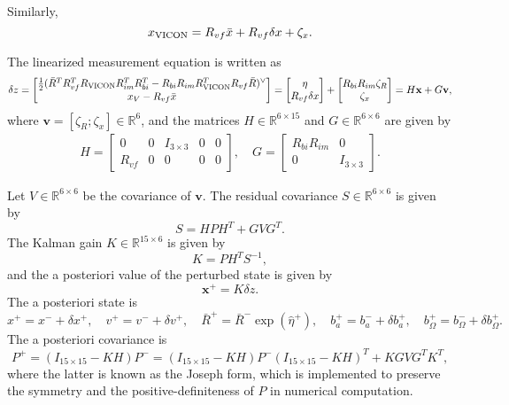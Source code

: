 \documentclass[11pt]{article}
\renewcommand{\Re}{\ensuremath{\mathbb{R}}}
\newcommand{\x}{\mathbf{x}}
\begin{document}
Similarly,
\[
x_{\mathrm{VICON}} = R_{vf}\bar x + R_{vf}\delta x + \zeta_x.
\]

The linearized measurement equation is written as
\begin{align*}
\delta z=\begin{bmatrix} \frac{1}{2}(\bar R^T R_{vf}^T R_\V R_{im}^T R_{bi}^T  -R_{bi}R_{im} R_\V^T R_{vf}\bar R)^\vee\\
x_V-R_{vf}\bar x\end{bmatrix}
= 
\begin{bmatrix}
\eta \\
R_{vf} \delta x 
\end{bmatrix}
+
\begin{bmatrix}
R_{bi}R_{im}\zeta_R \\
\zeta_x
\end{bmatrix}
=
H\x + G\mathbf{v},
\end{align*}
where $\mathbf{v}=[\zeta_R; \zeta_x]\in\Re^6$, and the matrices $H\in\Re^{6\times 15}$ and $G\in\Re^{6\times 6}$ are given by
\begin{align*}
H = \begin{bmatrix} 0 & 0 & I_{3\times 3} & 0 & 0\\
R_{vf} & 0 & 0 & 0 & 0
\end{bmatrix},\quad
G=\begin{bmatrix} 
R_{bi}R_{im} & 0 \\
0 & I_{3\times 3}\end{bmatrix}.
\end{align*}

Let $V\in\Re^{6\times 6}$ be the covariance of $\mathbf{v}$. The residual covariance  $S\in\Re^{6\times 6}$ is given by
\[
S= HPH^T + GVG^T.
\]
The Kalman gain $K\in\Re^{15\times 6}$ is given by
\begin{equation}
K = P H^T S^{-1},
\end{equation}
and the a posteriori value of the perturbed state is given by 
\begin{equation}
\x^+ = K \delta z.
\end{equation}
The a posteriori state is
\begin{equation}
x^+ = x^- +  \delta x^+,\quad v^+ = v^-+\delta v^+,\quad \bar R^+ =\bar R^- \exp(\hat \eta^+),\quad b_a^+=b_a^- + \delta b_a^+, \quad b_\Omega^+=b_\Omega^- + \delta b_\Omega^+.
\end{equation}
The a posteriori covariance is
\begin{equation}
P^+ = (I_{15\times 15}-KH)P^-= (I_{15\times 15}-KH)P^-(I_{15\times 15}-KH)^T + K GVG^T K^T,
\end{equation}
where the latter is known as the Joseph form, which is implemented to preserve the symmetry and the positive-definiteness of $P$ in numerical computation.
\end{document}
